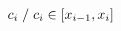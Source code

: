 \documentclass[preview]{standalone}
\begin{document}
\begin{align*}
c_i \hspace{0.1cm} / \hspace{0.1cm} c_i \in [x_{i-1}, x_i]
\end{align*}
\end{document}
